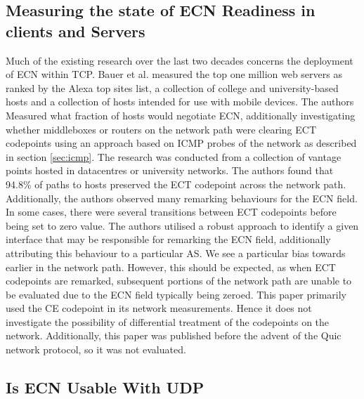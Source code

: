 \documentclass{l4proj}
\begin{document}
\subsection{Measuring the state of ECN Readiness in clients and Servers}


Much of the existing research over the last two decades concerns the deployment of ECN within TCP. Bauer et al.\cite{bauer_measuring_2011} measured the top one million web servers as ranked by the Alexa top sites list, a collection of college and university-based hosts and a collection of hosts intended for use with mobile devices. The authors Measured what fraction of hosts would negotiate ECN, additionally investigating whether middleboxes or routers on the network path were clearing ECT codepoints using an approach based on ICMP probes of the network as described in section \ref{sec:icmp}. The research was conducted from a collection of vantage points hosted in datacentres or university networks. The authors found that 94.8\% of paths to hosts preserved the ECT codepoint across the network path. Additionally, the authors observed many remarking behaviours for the ECN field.
In some cases, there were several transitions between ECT codepoints before being set to zero value. The authors utilised a robust approach to identify a given interface that may be responsible for remarking the ECN field, additionally attributing this behaviour to a particular AS. We see a particular bias towards earlier in the network path. However, this should be expected, as when ECT codepoints are remarked, subsequent portions of the network path are unable to be evaluated due to the ECN field typically being zeroed. This paper primarily used the CE codepoint in its network measurements. Hence it does not investigate the possibility of differential treatment of the codepoints on the network. Additionally, this paper was published before the advent of the Quic network protocol, so it was not evaluated.


\subsection{Is ECN Usable With UDP}
\end{document}
